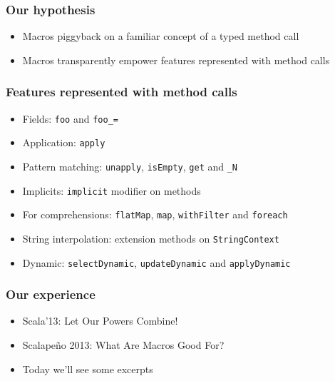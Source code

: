 \documentclass[svgnames,hyperref={bookmarks=false}]{beamer}
\begin{document}
\begin{frame}[fragile]
\frametitle{Our hypothesis}

\begin{itemize}
\item Macros piggyback on a familiar concept of a typed method call
\item Macros transparently empower features represented with method calls
\end{itemize}
\end{frame}

\begin{frame}[fragile]
\frametitle{Features represented with method calls}

\begin{itemize}
\item Fields: \texttt{foo} and \texttt{foo\_=}
\item Application: \texttt{apply}
\item Pattern matching: \texttt{unapply}, \texttt{isEmpty}, \texttt{get} and \texttt{\_N}
\item Implicits: \texttt{implicit} modifier on methods
\item For comprehensions: \texttt{flatMap}, \texttt{map}, \texttt{withFilter} and \texttt{foreach}
\item String interpolation: extension methods on \texttt{StringContext}
\item Dynamic: \texttt{selectDynamic}, \texttt{updateDynamic} and \texttt{applyDynamic}
\end{itemize}
\end{frame}

\begin{frame}[fragile]
\frametitle{Our experience}

\begin{itemize}
\item Scala'13: Let Our Powers Combine!
\item Scalape\~no 2013: What Are Macros Good For?
\item Today we'll see some excerpts
\end{itemize}
\end{frame}
\end{document}
